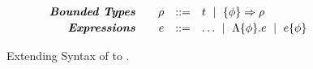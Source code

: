 
\begin{figure}[t!]
$$
\begin{array}{rrcl}
\centering

\emphbf{Bounded Types} \quad 
  & \bt         & ::= & \rtyp 
                        \spmid \tconstraint{\constraint}{\bt} \\[0.03in]

\emphbf{Expressions} \quad 
  & e           & ::= & \dots 
                        \spmid \econstraint{\constraint}{e} 
                        \spmid \econstantconstraint{e}{\constraint} \\
\end{array}
$$
\caption{Extending Syntax of \corelan to \boundedcorelan.} 
\label{fig:boundedsyntax}
\end{figure}

